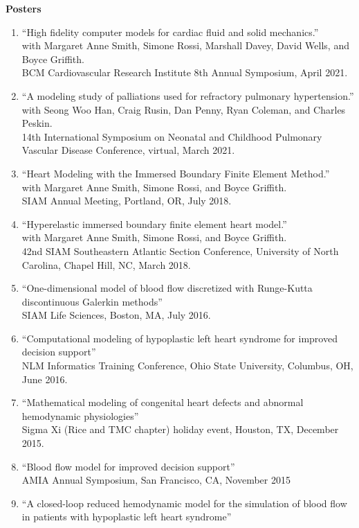 \documentclass{article} %
\begin{document}
\vspace{0.5cm}
\noindent
{\bf \large Posters}
\begin{enumerate}
\item ``High fidelity computer models for cardiac fluid and solid mechanics.''\\
with Margaret Anne Smith, Simone Rossi, Marshall Davey, David Wells, and Boyce Griffith. \\
BCM Cardiovascular Research Institute 8th Annual Symposium, April 2021.
\item ``A modeling study of palliations used for refractory pulmonary hypertension.'' \\
with Seong Woo Han, Craig Rusin, Dan Penny, Ryan Coleman, and Charles Peskin. \\
14th International Symposium on Neonatal and Childhood Pulmonary Vascular Disease Conference, virtual, March 2021.
\item ``Heart Modeling with the Immersed Boundary Finite Element Method.'' \\
with Margaret Anne Smith, Simone Rossi, and Boyce Griffith. \\
SIAM Annual Meeting, Portland, OR, July 2018. 
\item ``Hyperelastic immersed boundary finite element heart model.'' \\
with Margaret Anne Smith, Simone Rossi, and Boyce Griffith. \\
42nd SIAM Southeastern Atlantic Section Conference, University of North Carolina, Chapel Hill, NC, March 2018.
\item ``One-dimensional model of blood flow discretized with Runge-Kutta discontinuous Galerkin methods'' \\
SIAM Life Sciences, Boston, MA, July 2016.
\item ``Computational modeling of hypoplastic left heart syndrome for improved decision support''\\
NLM Informatics Training Conference, Ohio State University, Columbus, OH, June 2016.
\item ``Mathematical modeling of congenital heart defects and abnormal hemodynamic physiologies'' \\
Sigma Xi (Rice and TMC chapter) holiday event, Houston, TX, December 2015.
\item ``Blood flow model for improved decision support'' \\
AMIA Annual Symposium, San Francisco, CA, November 2015 
\item ``A closed-loop reduced hemodynamic model for the simulation of blood flow in patients with hypoplastic left heart syndrome'' \\

\end{enumerate}
\end{document}
